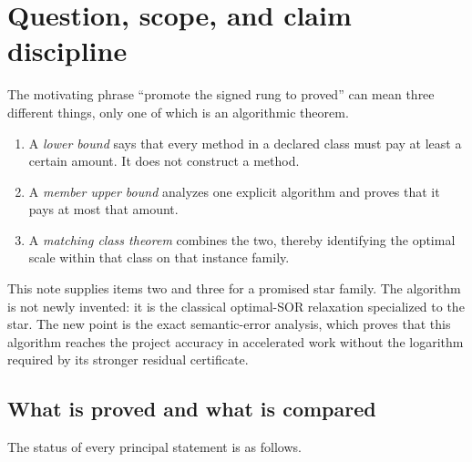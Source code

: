 \section{Question, scope, and claim discipline}
\label{sec:signed-star-scope}

The motivating phrase ``promote the signed rung to proved'' can mean three
different things, only one of which is an algorithmic theorem.

\begin{enumerate}[leftmargin=*]
\item A \emph{lower bound} says that every method in a declared class must pay
      at least a certain amount.  It does not construct a method.
\item A \emph{member upper bound} analyzes one explicit algorithm and proves
      that it pays at most that amount.
\item A \emph{matching class theorem} combines the two, thereby identifying
      the optimal scale within that class on that instance family.
\end{enumerate}

This note supplies items two and three for a promised star family.  The
algorithm is not newly invented: it is the classical optimal-SOR relaxation
specialized to the star.  The new point is the exact semantic-error analysis,
which proves that this algorithm reaches the project accuracy in accelerated
work without the logarithm required by its stronger residual certificate.

\subsection{What is proved and what is compared}

The status of every principal statement is as follows.

